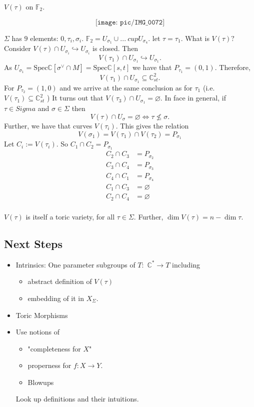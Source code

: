 \documentclass[a4paper,12pt]{amsart}
\newcommand{\C}{\ensuremath{\mathbb{C}}}
\begin{document}
\begin{example}
	$V(\tau)$ on $\mathbb{F}_2.$  
	
\[\texttt{[image: pic/IMG\_0072]}\]

	$\Sigma$ has $9$ elements: $0,\tau_i,\sigma_i.$ $\mathbb{F}_2=U_{\sigma_1} \cup ...\ cup U_{\sigma_4}.$ let $\tau=\tau_1.$ What is $V(\tau)?$
	Consider $V(\tau)\cap U_{\sigma_i}\hookrightarrow U_{\sigma_i}$ is closed. Then \[V(\tau_1)\cap U_{\sigma_1}\hookrightarrow U_{\sigma_1}.\]
	As $U_{\sigma_1}=\text{Spec} \C[\sigma^\vee\cap M]=\text{Spec} \C[s,t]$
	we have that $P_{\tau_1}=(0,1).$ Therefore, \[V(\tau_1)\cap U_{\sigma_1}\subseteq \C^2_{st}.\] For $P_{\tau_2}=(1,0)$ and we arrive at the same conclusion as for $\tau_1$ (i.e. $V(\tau_1)\subseteq \C^2_{st}$ )
	It turns out that $V(\tau_3)\cap U_{\sigma_1}=\varnothing.$ 
	In face in general, if $\tau\in Sigma$ and $\sigma\in \Sigma$ then \[V(\tau)\cap U_\sigma=\varnothing \iff \tau \not\leq \sigma.\]
	Further, we have that curves $V(\tau_i).$ This gives the relation \[ V(\sigma_1)=V(\tau_1)\cap V(\tau_2)=P_{\sigma_1}\]
	Let $C_i:=V(\tau_i).$ So $C_1\cap C_2=P_{\sigma_1}$ \begin{align*}
		C_2\cap C_3&=P_{\sigma_2}\\
		C_3\cap C_4&=P_{\sigma_3}\\
		C_4\cap C_1&=P_{\sigma_4}\\
		C_1\cap C_3&=\varnothing  \\
		C_2\cap C_4&=\varnothing \\
	\end{align*}
\begin{proposition}
	$V(\tau)$ is itself a toric variety, for all $\tau\in \Sigma.$ Further, $\dim V(\tau)=n-\dim \tau.$  
\end{proposition}	

	
\end{example}


\subsection*{Next Steps}
\begin{itemize}
	\item Intrinsics: One parameter subgroups of $T:$ $\C^*\to T$ including 
	 \begin{itemize}
	 	\item abstract definition of $V(\tau)$ 
	 	\item embedding of it in $X_\Sigma.$
	 \end{itemize}
	 \item Toric Morphisms
	 \item Use notions of 
	 \begin{itemize}
	 	\item "completeness for $X$"
	 	\item properness for $f:X\to Y.$
	 	\item Blowups
\end{itemize}	  
Look up definitions and their intuitions. 
\end{itemize}
\newpage
\end{document}
